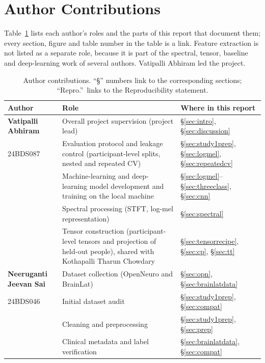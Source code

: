 \documentclass[10pt,twocolumn,a4paper]{article}
\newcommand{\sref}[1]{\S\ref{#1}}
\begin{document}
\section*{Author Contributions}
\label{sec:contrib}
Table~\ref{tab:contrib} lists each author's roles and the parts of this report that document them; every section, figure and table number in the table is a link. Feature extraction is not listed as a separate role, because it is part of the spectral, tensor, baseline and deep-learning work of several authors. Vatipalli Abhiram led the project.

\begin{table}[!t]
\centering\footnotesize
\caption{Author contributions. ``\S'' numbers link to the corresponding sections; ``Repro.''\ links to the Reproducibility statement.}
\label{tab:contrib}
\begin{tabular}{@{}p{}p{}p{}@{}}
\toprule
Author & Role & Where in this report\\
\midrule
\textbf{Vatipalli Abhiram} & Overall project supervision (project lead) & \sref{sec:intro}, \sref{sec:discussion}\\
24BDS087 & Evaluation protocol and leakage control (participant-level splits, nested and repeated CV) & \sref{sec:study1prep}, \sref{sec:logmel}, \sref{sec:repeatedcv}\\
 & Machine-learning and deep-learning model development and training on the local machine & \sref{sec:logmel}--\sref{sec:threeclass}, \sref{sec:cnn}\\
 & Spectral processing (STFT, log-mel representation) & \sref{sec:spectral}\\
 & Tensor construction (participant-level tensors and projection of held-out people), shared with Kothapalli Tharun Chowdary & \sref{sec:tensorrecipe}, \sref{sec:cp}, \sref{sec:tt}\\
\midrule
\textbf{Neeruganti Jeevan Sai} & Dataset collection (OpenNeuro and BrainLat) & \sref{sec:opn}, \sref{sec:brainlatdata}\\
24BDS046 & Initial dataset audit & \sref{sec:study1prep}, \sref{sec:compat}\\
 & Cleaning and preprocessing & \sref{sec:study1prep}, \sref{sec:prep}\\
 & Clinical metadata and label verification & \sref{sec:brainlatdata}, \sref{sec:compat}\\

\end{tabular}
\end{table}
\end{document}
